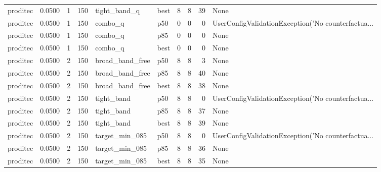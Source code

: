 \begin{tabular}{lrrrllrrrl}
proditec &    0.0500 &    1 &    150 &         tight\_band\_q &   best &               8 &          8 &      39 &                                               None \\
proditec &    0.0500 &    1 &    150 &              combo\_q &    p50 &               0 &          0 &       0 & UserConfigValidationException('No counterfactua... \\
proditec &    0.0500 &    1 &    150 &              combo\_q &    p85 &               0 &          0 &       0 &                                               None \\
proditec &    0.0500 &    1 &    150 &              combo\_q &   best &               0 &          0 &       0 &                                               None \\
proditec &    0.0500 &    2 &    150 &      broad\_band\_free &    p50 &               8 &          8 &       3 &                                               None \\
proditec &    0.0500 &    2 &    150 &      broad\_band\_free &    p85 &               8 &          8 &      40 &                                               None \\
proditec &    0.0500 &    2 &    150 &      broad\_band\_free &   best &               8 &          8 &      38 &                                               None \\
proditec &    0.0500 &    2 &    150 &           tight\_band &    p50 &               8 &          8 &       0 & UserConfigValidationException('No counterfactua... \\
proditec &    0.0500 &    2 &    150 &           tight\_band &    p85 &               8 &          8 &      37 &                                               None \\
proditec &    0.0500 &    2 &    150 &           tight\_band &   best &               8 &          8 &      39 &                                               None \\
proditec &    0.0500 &    2 &    150 &       target\_min\_085 &    p50 &               8 &          8 &       0 & UserConfigValidationException('No counterfactua... \\
proditec &    0.0500 &    2 &    150 &       target\_min\_085 &    p85 &               8 &          8 &      36 &                                               None \\
proditec &    0.0500 &    2 &    150 &       target\_min\_085 &   best &               8 &          8 &      35 &                                               None \\

\end{tabular}
